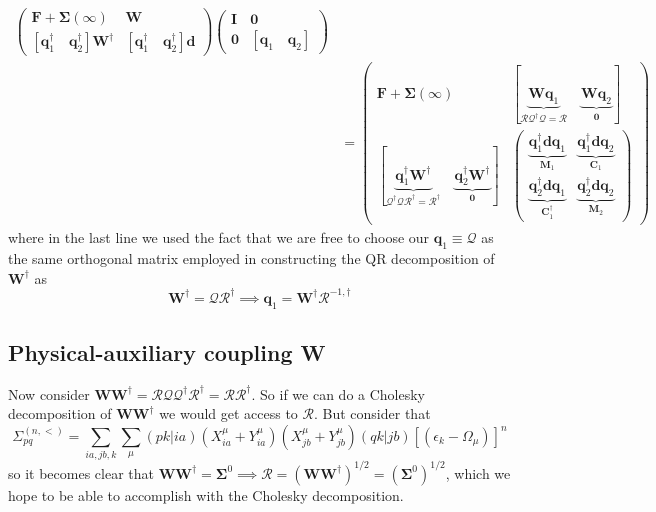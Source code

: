 \begin{align}
\begin{pmatrix}
        \bm{F} + \bm{\Sigma}(\infty) & \bm{W} \\
        [\bm{q}_1^{\dag} \quad \bm{q}_2^{\dag}]\bm{W}^{\dagger} & [\bm{q}_1^{\dag} \quad \bm{q}_2^{\dag}]\bm{d}
    \end{pmatrix}
    \begin{pmatrix}
        \bm{I} & \bm{0} \\
        \bm{0} & [\bm{q}_1\quad \bm{q}_2]
    \end{pmatrix}\\
    &= \begin{pmatrix}
        \bm{F} + \bm{\Sigma}(\infty) & [\underbrace{\bm{W}\bm{q}_1}_{\bm{\mathcal{R}}\bm{\mathcal{Q}}^{\dag}\bm{\mathcal{Q}}=\bm{\mathcal{R}}} \quad \underbrace{\bm{W}\bm{q}_2}_{\bm{0}}]\\
        [\underbrace{\bm{q}_1^{\dag}\bm{W}^{\dagger}}_{\bm{\mathcal{Q}}^{\dagger}\bm{\mathcal{Q}}\bm{\mathcal{R}}^{\dagger}= \bm{\mathcal{R}}^{\dagger}}\quad \underbrace{\bm{q}_2^{\dag}\bm{W}^{\dagger}}_{\bm{0}}] & \begin{pmatrix}
            \underbrace{\bm{q}_1^{\dag}\bm{d}\bm{q}_1}_{\bm{M}_1} & \underbrace{\bm{q}_1^{\dag}\bm{d}\bm{q}_2}_{\bm{C}_1}\\
            \underbrace{\bm{q}_2^{\dag}\bm{d}\bm{q}_1}_{\bm{C}_1^{\dagger}} & \underbrace{\bm{q}_2^{\dag}\bm{d}\bm{q}_2}_{\bm{M}_2}
        \end{pmatrix}
    \end{pmatrix}
    \label{eqn:lanczos_projection}
\end{align}
where in the last line we used the fact that we are free to choose our $\bm{q}_1 \equiv \bm{\mathcal{Q}}$ as the same orthogonal matrix employed in constructing the QR decomposition of $\bm{W}^{\dagger}$ as 
\begin{equation}
    \bm{W}^{\dagger} = \bm{\mathcal{Q}}\bm{\mathcal{R}}^{\dagger} \implies \bm{q}_1 = \bm{W}^{\dagger}\bm{\mathcal{R}}^{-1, \dagger}
\end{equation}
\subsection{Physical-auxiliary coupling W}
Now consider $\bm{W}\bm{W}^{\dagger} = \bm{\mathcal{R}}\bm{\mathcal{Q}}\bm{\mathcal{Q}}^{\dagger}\bm{\mathcal{R}}^{\dagger} = \bm{\mathcal{R}}\bm{\mathcal{R}}^{\dagger}$. So if we can do a Cholesky decomposition of $\bm{W}\bm{W}^{\dagger}$ we would get access to $\bm{\mathcal{R}}$. But consider that
\begin{equation}
    \Sigma_{p q}^{(n, <)} = \sum_{ia,jb,k}\sum_{\mu}  (pk|ia)\left(X_{ia}^{\mu } + Y_{ia}^{\mu }\right)\left(X_{jb}^{\mu } + Y_{jb}^{\mu }\right)(qk|jb) [\left(\epsilon_k-\Omega_{\mu }\right)]^n
 \end{equation}
so it becomes clear that $\bm{W}\bm{W}^{\dagger}=\bm{\Sigma}^0 \implies \bm{\mathcal{R}}=\left(\bm{W}\bm{W}^{\dagger}\right)^{1/2} = \left(\bm{\Sigma}^0\right)^{1/2}$, which we hope to be able to accomplish with the Cholesky decomposition. 
